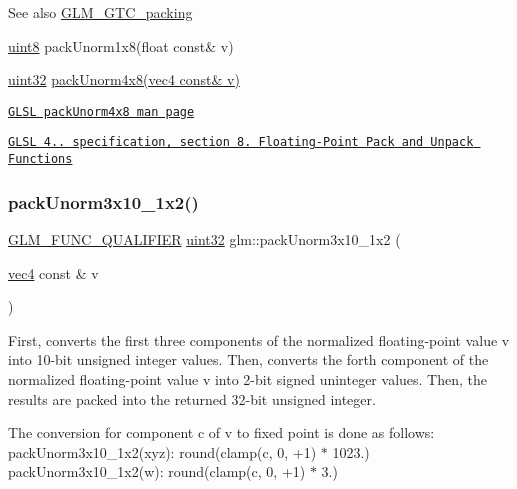 \begin{DoxySeeAlso}{See also}
\hyperlink{group__gtc__packing}{G\+L\+M\+\_\+\+G\+T\+C\+\_\+packing} 

\hyperlink{group__gtc__type__precision_ga1a7dcd8aac97cc8020817c94049deff2}{uint8} pack\+Unorm1x8(float const\& v) 

\hyperlink{group__gtc__type__precision_ga202b6a53c105fcb7e531f9b443518451}{uint32} \hyperlink{group__core__func__packing_gaf7d2f7341a9eeb4a436929d6f9ad08f2}{pack\+Unorm4x8(vec4 const\& v)} 

\href{http://www.opengl.org/sdk/docs/manglsl/xhtml/packUnorm4x8.xml}{\tt G\+L\+SL pack\+Unorm4x8 man page} 

\href{http://www.opengl.org/registry/doc/GLSLangSpec.4.20.8.pdf}{\tt G\+L\+SL 4.. specification, section 8. Floating-\/\+Point Pack and Unpack Functions} 
\end{DoxySeeAlso}
\mbox{\label{group__gtc__packing_ga2cf2d11b40bd48639110456fd74c2e33}} 
\subsubsection{\texorpdfstring{pack\+Unorm3x10\+\_\+1x2()}{packUnorm3x10\_1x2()}}
{\footnotesize\ttfamily \hyperlink{setup_8hpp_a33fdea6f91c5f834105f7415e2a64407}{G\+L\+M\+\_\+\+F\+U\+N\+C\+\_\+\+Q\+U\+A\+L\+I\+F\+I\+ER} \hyperlink{group__gtc__type__precision_ga202b6a53c105fcb7e531f9b443518451}{uint32} glm\+::pack\+Unorm3x10\+\_\+1x2 (\begin{DoxyParamCaption}\item[{\hyperlink{group__core__types_ga5881b1b022d7fd1b7218f5916532dd02}{vec4} const \&}]{v }\end{DoxyParamCaption})}

First, converts the first three components of the normalized floating-\/point value v into 10-\/bit unsigned integer values. Then, converts the forth component of the normalized floating-\/point value v into 2-\/bit signed uninteger values. Then, the results are packed into the returned 32-\/bit unsigned integer.

The conversion for component c of v to fixed point is done as follows\+: pack\+Unorm3x10\+\_\+1x2(xyz)\+: round(clamp(c, 0, +1) $\ast$ 1023.) pack\+Unorm3x10\+\_\+1x2(w)\+: round(clamp(c, 0, +1) $\ast$ 3.)

